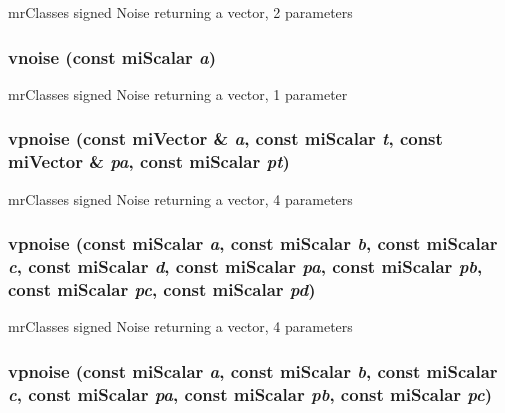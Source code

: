 mr\-Classes signed Noise returning a vector, 2 parameters 

\subsubsection{ vnoise (const mi\-Scalar {\em a})\hspace{0.3cm}{\tt  [inline]}}\label{namespacersl_a77}


mr\-Classes signed Noise returning a vector, 1 parameter 

\subsubsection{ vpnoise (const mi\-Vector \& {\em a}, const mi\-Scalar {\em t}, const mi\-Vector \& {\em pa}, const mi\-Scalar {\em pt})\hspace{0.3cm}{\tt  [inline]}}\label{namespacersl_a111}


mr\-Classes signed Noise returning a vector, 4 parameters 

\subsubsection{ vpnoise (const mi\-Scalar {\em a}, const mi\-Scalar {\em b}, const mi\-Scalar {\em c}, const mi\-Scalar {\em d}, const mi\-Scalar {\em pa}, const mi\-Scalar {\em pb}, const mi\-Scalar {\em pc}, const mi\-Scalar {\em pd})\hspace{0.3cm}{\tt  [inline]}}\label{namespacersl_a110}


mr\-Classes signed Noise returning a vector, 4 parameters 

\subsubsection{ vpnoise (const mi\-Scalar {\em a}, const mi\-Scalar {\em b}, const mi\-Scalar {\em c}, const mi\-Scalar {\em pa}, const mi\-Scalar {\em pb}, const mi\-Scalar {\em pc})\hspace{0.3cm}{\tt  [inline]}}\label{namespacersl_a109}


